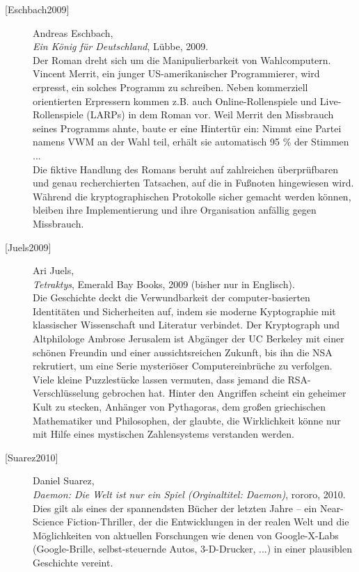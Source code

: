 \begin{description}
\item[\textrm{[Eschbach2009]}] 
    Andreas Eschbach,\\
    {\em Ein König für Deutschland}, Lübbe, 2009.\\
    Der Roman dreht sich um die Manipulierbarkeit von Wahlcomputern.\\
    Vincent Merrit, ein junger US-amerikanischer Programmierer, wird erpresst,
    ein solches Programm zu schreiben. Neben kommerziell orientierten Erpressern
    kommen z.B. auch Online-Rollenspiele und Live-Rollenspiele (LARPs) in dem Roman vor.
    Weil Merrit den Missbrauch seines Programms ahnte, baute er eine Hintertür
    ein: Nimmt eine Partei namens VWM an der Wahl teil, erhält sie automatisch
    95 \% der Stimmen ...\\
    Die fiktive Handlung des Romans beruht auf zahlreichen überprüfbaren und
    genau recherchierten Tatsachen, auf die in Fußnoten hingewiesen wird.\\
    Während die kryptographischen Protokolle sicher gemacht werden können,
    bleiben ihre Implementierung und ihre Organisation anfällig gegen Missbrauch.\\


\item[\textrm{[Juels2009]}] 
    Ari Juels,\\
    {\em Tetraktys}, Emerald Bay Books, 2009 (bisher nur in Englisch).\\
    Die Geschichte deckt die Verwundbarkeit der computer-basierten Identitäten und
    Sicherheiten auf, indem sie moderne Kyptographie mit klassischer Wissenschaft und
    Literatur verbindet.
    Der Kryptograph und Altphilologe Ambrose Jerusalem ist Abgänger der UC Berkeley
    mit einer schönen Freundin und einer aussichtsreichen Zukunft, bis ihn die NSA
    rekrutiert, um eine Serie mysteriöser Computereinbrüche zu verfolgen. Viele kleine
    Puzzlestücke lassen vermuten, dass jemand die RSA-Verschlüsselung gebrochen hat.
    Hinter den Angriffen scheint ein geheimer Kult zu stecken, Anhänger von Pythagoras,
    dem großen griechischen Mathematiker und Philosophen, der glaubte, die Wirklichkeit
    könne nur mit Hilfe eines mystischen Zahlensystems verstanden werden.\\


\item[\textrm{[Suarez2010]}] 
    Daniel Suarez, \\
    {\em Daemon: Die Welt ist nur ein Spiel (Orginaltitel: Daemon)}, rororo, 2010. \\
    Dies gilt als eines der spannendsten Bücher der letzten Jahre -- ein Near-Science
    Fiction-Thriller, der die Entwicklungen in der realen Welt und die Möglichkeiten von
    aktuellen Forschungen wie denen von Google-X-Labs (Google-Brille, selbst-steuernde
    Autos, 3-D-Drucker, ...) in einer plausiblen Geschichte vereint.


\end{description}
